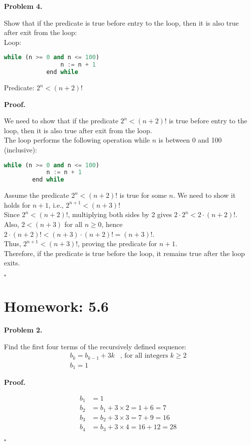 \documentclass{article}
\newenvironment{problem}[1]{
    \begin{mdframed}[backgroundcolor=gray!20, skipabove=\baselineskip, skipbelow=\baselineskip, nobreak=true, innerleftmargin=10pt, innerrightmargin=10pt, innertopmargin=10pt, innerbottommargin=10pt]
    \textbf{Problem #1.}
}{
    \end{mdframed}
}
\newenvironment{proof}{
    \begin{mdframed}[nobreak=false, innerleftmargin=10pt, innerrightmargin=10pt, innertopmargin=10pt, innerbottommargin=10pt]
    \textbf{Proof.}
}{
    \hfill $\square$
    \end{mdframed}
}
\begin{document}
    \begin{problem}{4}
        Show that if the predicate is true before entry to the loop, then it is also true after exit from the loop: \\
        Loop:
        \begin{lstlisting}[language=Python]
            while (n >= 0 and n <= 100)
                n := n + 1
            end while
        \end{lstlisting}
        Predicate: $2^n < (n+2)! $
    \end{problem}
    \begin{proof}
        We need to show that if the predicate $2^n < (n+2)!$ is true before entry to the loop, then it is also true after exit from the loop. \\
        The loop performs the following operation while $n$ is between 0 and 100 (inclusive):
        \begin{lstlisting}[language=Python]
        while (n >= 0 and n <= 100)
            n := n + 1
        end while
        \end{lstlisting}
        Assume the predicate $2^n < (n+2)!$ is true for some $n$. We need to show it holds for $n+1$, i.e., $2^{n+1} < {(n+3)} ! $ \\
        Since $2^n < (n+2)!$, multiplying both sides by 2 gives $2 \cdot 2^n < 2 \cdot (n+2)!$. Also, $2 < (n+3)$ for all $n \geq 0$, hence $2 \cdot (n+2)! < (n+3) \cdot (n+2)! = (n+3)!$. \\
        Thus, $2^{n+1} < (n+3)!$, proving the predicate for $n+1$. \\
        Therefore, if the predicate is true before the loop, it remains true after the loop exits.
    \end{proof}

\newpage \section{Homework: 5.6}
    \begin{problem}{2}
        Find the first four terms of the recursively defined sequence:
        \begin{align*}
            b_k = b_{k-1} + 3k & \text{, for all integers } k \geq 2 \\
            b_1 = 1
        \end{align*}
    \end{problem}
    \begin{proof}
        \begin{align*}
            b_1 &= 1 \\
            b_2 &= b_{1} + 3 \times 2 = 1 + 6 = 7 \\
            b_3 &= b_{2} + 3 \times 3 = 7 + 9 = 16 \\
            b_4 &= b_{3} + 3 \times 4 = 16 + 12 = 28
        \end{align*}
    \end{proof}
    
\end{document}
